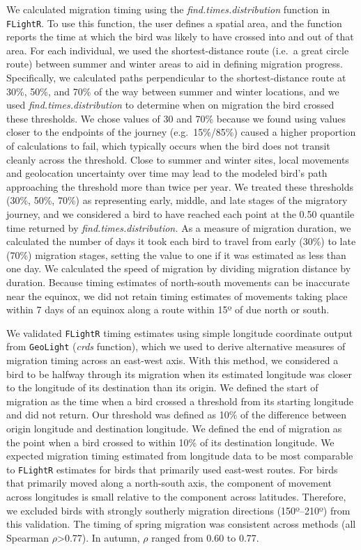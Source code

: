 \documentclass[a4paper, twoside]{templates/ociamthesis}
\begin{document}
We calculated migration timing using the \emph{find.times.distribution} function in \texttt{FLightR}. To use this function, the user defines a spatial area, and the function reports the time at which the bird was likely to have crossed into and out of that area. For each individual, we used the shortest-distance route (i.e.~a great circle route) between summer and winter areas to aid in defining migration progress. Specifically, we calculated paths perpendicular to the shortest-distance route at 30\%, 50\%, and 70\% of the way between summer and winter locations, and we used \emph{find.times.distribution} to determine when on migration the bird crossed these thresholds. We chose values of 30 and 70\% because we found using values closer to the endpoints of the journey (e.g.~15\%/85\%) caused a higher proportion of calculations to fail, which typically occurs when the bird does not transit cleanly across the threshold. Close to summer and winter sites, local movements and geolocation uncertainty over time may lead to the modeled bird's path approaching the threshold more than twice per year. We treated these thresholds (30\%, 50\%, 70\%) as representing early, middle, and late stages of the migratory journey, and we considered a bird to have reached each point at the 0.50 quantile time returned by \emph{find.times.distribution.} As a measure of migration duration, we calculated the number of days it took each bird to travel from early (30\%) to late (70\%) migration stages, setting the value to one if it was estimated as less than one day. We calculated the speed of migration by dividing migration distance by duration. Because timing estimates of north-south movements can be inaccurate near the equinox, we did not retain timing estimates of movements taking place within 7 days of an equinox along a route within 15º of due north or south.

We validated \texttt{FLightR} timing estimates using simple longitude coordinate output from \texttt{GeoLight} (\emph{crds} function), which we used to derive alternative measures of migration timing across an east-west axis. With this method, we considered a bird to be halfway through its migration when its estimated longitude was closer to the longitude of its destination than its origin. We defined the start of migration as the time when a bird crossed a threshold from its starting longitude and did not return. Our threshold was defined as 10\% of the difference between origin longitude and destination longitude. We defined the end of migration as the point when a bird crossed to within 10\% of its destination longitude. We expected migration timing estimated from longitude data to be most comparable to \texttt{FLightR} estimates for birds that primarily used east-west routes. For birds that primarily moved along a north-south axis, the component of movement across longitudes is small relative to the component across latitudes. Therefore, we excluded birds with strongly southerly migration directions (150º--210º) from this validation. The timing of spring migration was consistent across methods (all Spearman \(\rho\)\textgreater0.77). In autumn, \(\rho\) ranged from 0.60 to 0.77.
\end{document}
